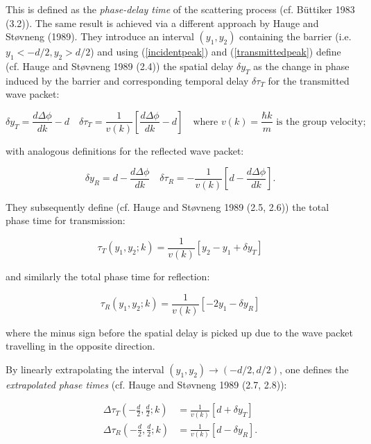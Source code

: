 \documentclass{article}
\begin{document}
\noindent This is defined as the \textit{phase-delay time} of the scattering process (cf. B{\"u}ttiker 1983 (3.2)).
The same result is achieved via a different approach by Hauge and St{\o}vneng (1989). They introduce an interval $(y_1, y_2)$ containing the barrier (i.e. $y_1<-d/2,y_2>d/2$) and using (\ref{incidentpeak}) and (\ref{transmittedpeak}) define (cf. Hauge and St{\o}vneng 1989 (2.4)) the spatial delay $\delta y_T$ as the change in phase induced by the barrier and corresponding temporal delay $\delta\tau_T$ for the transmitted wave packet:

\begin{equation}
	\delta y_T = \frac{d\Delta\phi}{dk}-d \quad \delta\tau_T=\frac{1}{v(k)} \left[\frac{d\Delta\phi}{dk}-d\right] \quad \text{where $v(k) = \frac{\hbar k}{m}$ is the group velocity;}
	\label{transmittedphaseshift}
\end{equation}

\noindent with analogous definitions for the reflected wave packet:

\begin{equation}
	\delta y_R = d-\frac{d\Delta\phi}{dk} \quad \delta\tau_R=-\frac{1}{v(k)} \left[d-\frac{d\Delta\phi}{dk}\right].
	\label{reflectedphaseshift}
\end{equation}

\noindent They subsequently define (cf. Hauge and St{\o}vneng 1989 (2.5, 2.6)) the total phase time for transmission:

\begin{equation}
	\tau_T(y_1,y_2;k) = \frac{1}{v(k)}[y_2-y_1+\delta y_T]
\end{equation}

\noindent and similarly the total phase time for reflection:

\begin{equation}
	\tau_R(y_1,y_2;k) = \frac{1}{v(k)}[-2y_1-\delta y_R]
\end{equation}

\noindent where the minus sign before the spatial delay is picked up due to the wave packet travelling in the opposite direction.

\noindent By linearly extrapolating the interval $(y_1,y_2) \rightarrow (-d/2,d/2)$, one defines the \textit{extrapolated phase times} (cf. Hauge and St{\o}vneng 1989 (2.7, 2.8)):

\begin{align}
	\Delta\tau_T(-\frac{d}{2},\frac{d}{2};k) &= \frac{1}{v(k)}[d+\delta y_T] \label{deltataut}\\
	\Delta\tau_R(-\frac{d}{2},\frac{d}{2};k) &= \frac{1}{v(k)}[d-\delta y_R] \label{deltataur}.
\end{align}
\end{document}
